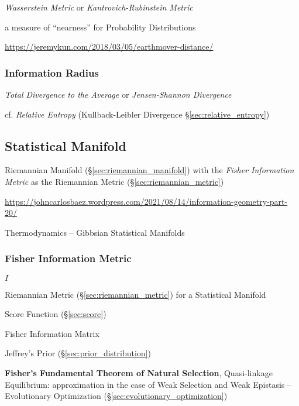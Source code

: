 \emph{Wasserstein Metric} or \emph{Kantrovich-Rubinstein Metric}

a measure of ``nearness'' for Probability Distributions

\url{https://jeremykun.com/2018/03/05/earthmover-distance/}



\subsubsection{Information Radius}\label{sec:information_radius}

\emph{Total Divergence to the Average} or \emph{Jensen-Shannon Divergence}

cf. \emph{Relative Entropy} (Kullback-Leibler Divergence
\S\ref{sec:relative_entropy})



\subsection{Statistical Manifold}\label{sec:statistical_manifold}

Riemannian Manifold (\S\ref{sec:riemannian_manifold}) with the
\emph{Fisher Information Metric} as the Riemannian Metric
(\S\ref{sec:riemannian_metric})

\url{https://johncarlosbaez.wordpress.com/2021/08/14/information-geometry-part-20/}

Thermodynamics -- Gibbsian Statistical Manifolds



\subsubsection{Fisher Information Metric}\label{sec:fisher_metric}

$I$

Riemannian Metric (\S\ref{sec:riemannian_metric}) for a Statistical Manifold

Score Function (\S\ref{sec:score})

Fisher Information Matrix

Jeffrey's Prior (\S\ref{sec:prior_distribution})

\fist \textbf{Fisher's Fundamental Theorem of Natural Selection},
Quasi-linkage Equilibrium: approximation in the case of Weak Selection
and Weak Epistasis -- Evolutionary Optimization
(\S\ref{sec:evolutionary_optimization}) %

